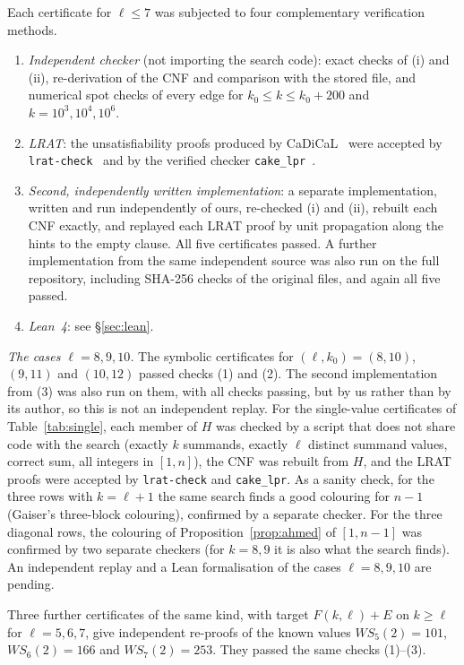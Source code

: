 \documentclass[11pt]{amsart}
\theoremstyle{definition}
\newcommand{\F}{F}
\begin{document}
\noindent Each certificate for $\ell\le7$ was subjected to four complementary verification methods.
\begin{enumerate}[label=(\arabic*)]
\item \emph{Independent checker} (not importing the search code): exact checks of (i) and (ii), re-derivation of the CNF and comparison with the stored file, and numerical spot checks of every edge for $k_0\le k\le k_0+200$ and $k=10^3,10^4,10^6$.
\item \emph{LRAT}: the unsatisfiability proofs produced by CaDiCaL~\cite{cadical} were accepted by \texttt{lrat-check}~\cite{drattrim} and by the verified checker \texttt{cake\_lpr}~\cite{cakelpr}.
\item \emph{Second, independently written implementation}: a separate implementation, written and run independently of ours, re-checked (i) and (ii), rebuilt each CNF exactly, and replayed each LRAT proof by unit propagation along the hints to the empty clause. All five certificates passed. A further implementation from the same independent source was also run on the full repository, including SHA-256 checks of the original files, and again all five passed.
\item \emph{Lean~4}: see \S\ref{sec:lean}.
\end{enumerate}

\noindent \emph{The cases $\ell=8,9,10$.} The symbolic certificates for $(\ell,k_0)=(8,10)$, $(9,11)$ and $(10,12)$ passed checks (1) and (2). The second implementation from (3) was also run on them, with all checks passing, but by us rather than by its author, so this is not an independent replay. For the single-value certificates of Table~\ref{tab:single}, each member of $H$ was checked by a script that does not share code with the search (exactly $k$ summands, exactly $\ell$ distinct summand values, correct sum, all integers in $[1,n]$), the CNF was rebuilt from $H$, and the LRAT proofs were accepted by \texttt{lrat-check} and \texttt{cake\_lpr}. As a sanity check, for the three rows with $k=\ell+1$ the same search finds a good colouring for $n-1$ (Gaiser's three-block colouring), confirmed by a separate checker. For the three diagonal rows, the colouring of Proposition~\ref{prop:ahmed} of $[1,n-1]$ was confirmed by two separate checkers (for $k=8,9$ it is also what the search finds). An independent replay and a Lean formalisation of the cases $\ell=8,9,10$ are pending.

\noindent Three further certificates of the same kind, with target $\F(k,\ell)+E$ on $k\ge\ell$ for $\ell=5,6,7$, give independent re-proofs of the known values $WS_5(2)=101$, $WS_6(2)=166$ and $WS_7(2)=253$. They passed the same checks (1)--(3).
\end{document}
